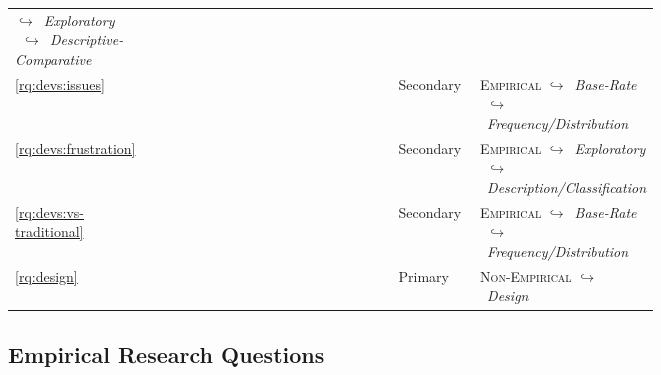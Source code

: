 \begin{table}[tbh]
{\begin{tabular}{p{0.07\linewidth}p{0.55\linewidth}|p{0.13\linewidth}p{.33\linewidth}}
{$\hookrightarrow$~\textit{Exploratory}\\
$~~\hookrightarrow$~\textit{Descriptive-Comparative}
}
\\
\ref{rq:devs:issues} &
\RQThreeTextDevMiscomprehensionIssueTypes{}&
Secondary &
\makecell[tl]{
\textsc{Empirical}\\
$\hookrightarrow$~\textit{Base-Rate}\\
$~~\hookrightarrow$~\textit{Frequency/Distribution}
}
\\
\ref{rq:devs:frustration} &
\RQThreeTextDevMiscomprehensionFrustration{} &
Secondary &
\makecell[tl]{
\textsc{Empirical}\\
$\hookrightarrow$~\textit{Exploratory}\\
$~~\hookrightarrow$~\textit{Description/Classification}
}
\\
\ref{rq:devs:vs-traditional} &
\RQThreeTextDevMiscomprehensionVsConventional{} &
Secondary &
\makecell[tl]{
\textsc{Empirical}\\
$\hookrightarrow$~\textit{Base-Rate}\\
$~~\hookrightarrow$~\textit{Frequency/Distribution}
}
\\
\midrule
\ref{rq:design} &
\RQFourDesign{} &
Primary &
\makecell[tl]{
\textsc{Non-Empirical}\\
$\hookrightarrow$~\textit{Design}\\
}
\\
\bottomrule
\end{tabular}}
\end{table}


\subsection{Empirical Research Questions}
\label{ssec:research-methodology:research-questions:empirical}

